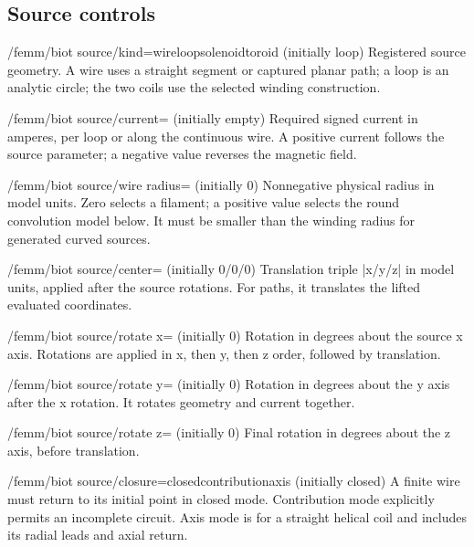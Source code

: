 \subsection{Source controls}
\begin{key}{/femm/biot source/kind=wire\textbar loop\textbar solenoid\textbar toroid (initially loop)}
Registered source geometry. A wire uses a straight segment or captured planar path; a loop is an analytic circle; the two coils use the selected winding construction.
\end{key}
\begin{key}{/femm/biot source/current= (initially empty)}
Required signed current in amperes, per loop or along the continuous wire. A positive current follows the source parameter; a negative value reverses the magnetic field.
\end{key}
\begin{key}{/femm/biot source/wire radius= (initially 0)}
Nonnegative physical radius in model units. Zero selects a filament; a positive value selects the round convolution model below. It must be smaller than the winding radius for generated curved sources.
\end{key}
\begin{key}{/femm/biot source/center= (initially 0/0/0)}
Translation triple |x/y/z| in model units, applied after the source rotations. For paths, it translates the lifted evaluated coordinates.
\end{key}
\begin{key}{/femm/biot source/rotate x= (initially 0)}
Rotation in degrees about the source x axis. Rotations are applied in x, then y, then z order, followed by translation.
\end{key}
\begin{key}{/femm/biot source/rotate y= (initially 0)}
Rotation in degrees about the y axis after the x rotation. It rotates geometry and current together.
\end{key}
\begin{key}{/femm/biot source/rotate z= (initially 0)}
Final rotation in degrees about the z axis, before translation.
\end{key}
\begin{key}{/femm/biot source/closure=closed\textbar contribution\textbar axis (initially closed)}
A finite wire must return to its initial point in closed mode. Contribution mode explicitly permits an incomplete circuit. Axis mode is for a straight helical coil and includes its radial leads and axial return.
\end{key}
